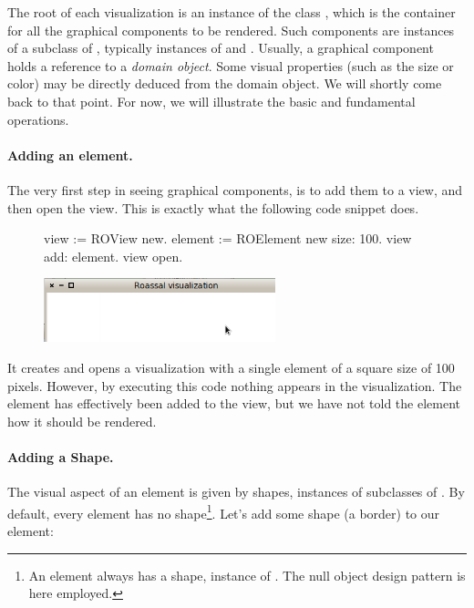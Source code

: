 \documentclass[a4paper,10pt,twoside]{book}
\begin{document}
The root of each visualization is an instance of the class , which is the container for all the graphical components to be rendered.
Such components are instances of a subclass of , typically instances of  and . Usually, a graphical component holds a reference to a \emph{domain object}. Some visual properties (such as the size or color) may be directly deduced from the domain object. We will shortly come back to that point. For now, we will illustrate the basic and fundamental operations.

\paragraph{Adding an element.} The very first step in seeing graphical components, is to add them to a view, and then open the view. This is exactly what the following code snippet does.

\begin{figure}[H]
      \begin{minipage}[t]{0.5\textwidth}
      \vspace{0pt}
\begin{code}{}
view := ROView new.
element := ROElement new size: 100.
view add: element.
view open.
\end{code}
   \end{minipage}
   \hfill
   \begin{minipage}[t]{0.6\textwidth}
      \vspace{0pt} \raggedright
       \centering
		\includegraphics[width=0.6\textwidth]{ex1}
   \end{minipage}
\label{fig:ex1}
\end{figure}

It creates and opens a visualization with a single element of a square size of 100 pixels. However, by executing this code nothing appears in the visualization. The element has effectively been added to the view, but we have not told the element how it should be rendered. 

\paragraph{Adding a Shape.} The visual aspect of an element is given by shapes, instances of subclasses of . By default, every element has no shape\footnote{An element always has a shape, instance of . The null object design pattern is here employed.}. Let's add some shape (a border) to our element: 
\end{document}
